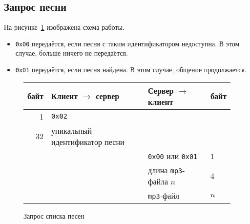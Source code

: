 \subsection{Запрос песни}

На рисунке~\ref{song} изображена схема работы.

\begin{itemize}
\item \texttt{0x00} передаётся, если песня с таким идентификатором
  недоступна. В этом случае, больше ничего не передаётся.
\item \texttt{0x01} передаётся, если песня найдена. В этом случае,
  общение продолжается.
\end{itemize}

\begin{figure}
  \label{song}
  \centering

  \begin{tabular}{|r|l|l|l|}
    \hline
    байт & Клиент $\to$ сервер & Сервер $\to$ клиент & байт \\
    \hline
    1 & \texttt{0x02} & & \\
    \hline
    32 & уникальный идентификатор песни & & \\
    \hline
    & & \texttt{0x00} или \texttt{0x01} & 1 \\
    \hline
    & & длина \texttt{mp3}-файла $n$ & 4 \\
    \hline
    & & \texttt{mp3}-файл & $n$ \\
    \hline
  \end{tabular}

  \caption{Запрос списка песен}
\end{figure}
